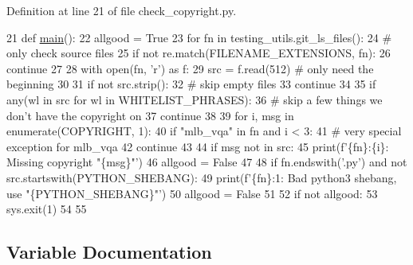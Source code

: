 Definition at line 21 of file check\+\_\+copyright.\+py.


\begin{DoxyCode}
21 \textcolor{keyword}{def }\hyperlink{namespacetests_1_1check__copyright_a9fcf3c755e0bf8e93320f2f09bd7ce04}{main}():
22     allgood = \textcolor{keyword}{True}
23     \textcolor{keywordflow}{for} fn \textcolor{keywordflow}{in} testing\_utils.git\_ls\_files():
24         \textcolor{comment}{# only check source files}
25         \textcolor{keywordflow}{if} \textcolor{keywordflow}{not} re.match(FILENAME\_EXTENSIONS, fn):
26             \textcolor{keywordflow}{continue}
27 
28         with open(fn, \textcolor{stringliteral}{'r') as f:}
29 \textcolor{stringliteral}{            src = f.read(512)  }\textcolor{comment}{# only need the beginning}
30 
31         \textcolor{keywordflow}{if} \textcolor{keywordflow}{not} src.strip():
32             \textcolor{comment}{# skip empty files}
33             \textcolor{keywordflow}{continue}
34 
35         \textcolor{keywordflow}{if} any(wl \textcolor{keywordflow}{in} src \textcolor{keywordflow}{for} wl \textcolor{keywordflow}{in} WHITELIST\_PHRASES):
36             \textcolor{comment}{# skip a few things we don't have the copyright on}
37             \textcolor{keywordflow}{continue}
38 
39         \textcolor{keywordflow}{for} i, msg \textcolor{keywordflow}{in} enumerate(COPYRIGHT, 1):
40             \textcolor{keywordflow}{if} \textcolor{stringliteral}{"mlb\_vqa"} \textcolor{keywordflow}{in} fn \textcolor{keywordflow}{and} i < 3:
41                 \textcolor{comment}{# very special exception for mlb\_vqa}
42                 \textcolor{keywordflow}{continue}
43 
44             \textcolor{keywordflow}{if} msg \textcolor{keywordflow}{not} \textcolor{keywordflow}{in} src:
45                 print(f\textcolor{stringliteral}{'\{fn\}:\{i\}: Missing copyright "\{msg\}"'})
46                 allgood = \textcolor{keyword}{False}
47 
48         \textcolor{keywordflow}{if} fn.endswith(\textcolor{stringliteral}{'.py'}) \textcolor{keywordflow}{and} \textcolor{keywordflow}{not} src.startswith(PYTHON\_SHEBANG):
49             print(f\textcolor{stringliteral}{'\{fn\}:1: Bad python3 shebang, use "\{PYTHON\_SHEBANG\}"'})
50             allgood = \textcolor{keyword}{False}
51 
52     \textcolor{keywordflow}{if} \textcolor{keywordflow}{not} allgood:
53         sys.exit(1)
54 
55 
\end{DoxyCode}


\subsection{Variable Documentation}
\mbox{\label{namespacetests_1_1check__copyright_a2aae78d9a278ab846941cce2c4c4c469}} 
